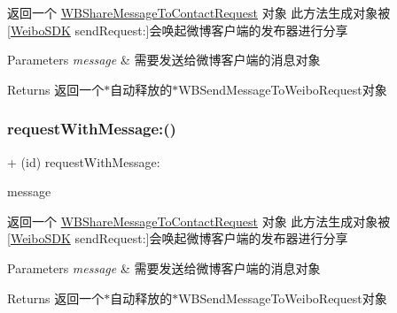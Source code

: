 返回一个 \mbox{\hyperlink{interface_w_b_share_message_to_contact_request}{W\+B\+Share\+Message\+To\+Contact\+Request}} 对象 此方法生成对象被\mbox{[}\mbox{\hyperlink{interface_weibo_s_d_k}{Weibo\+S\+DK}} send\+Request\+:\mbox{]}会唤起微博客户端的发布器进行分享 
\begin{DoxyParams}{Parameters}
{\em message} & 需要发送给微博客户端的消息对象 \\
\hline
\end{DoxyParams}
\begin{DoxyReturn}{Returns}
返回一个$\ast$自动释放的$\ast$\+W\+B\+Send\+Message\+To\+Weibo\+Request对象 
\end{DoxyReturn}
\mbox{\label{interface_w_b_share_message_to_contact_request_a8ee52281e0f9bb9f8b006d298760c001}} 
\subsubsection{\texorpdfstring{request\+With\+Message\+:()}{requestWithMessage:()}\hspace{0.1cm}{\footnotesize\ttfamily [2/3]}}
{\footnotesize\ttfamily + (id) request\+With\+Message\+: \begin{DoxyParamCaption}\item[{(\mbox{\hyperlink{interface_w_b_message_object}{W\+B\+Message\+Object}} $\ast$)}]{message }\end{DoxyParamCaption}}

返回一个 \mbox{\hyperlink{interface_w_b_share_message_to_contact_request}{W\+B\+Share\+Message\+To\+Contact\+Request}} 对象 此方法生成对象被\mbox{[}\mbox{\hyperlink{interface_weibo_s_d_k}{Weibo\+S\+DK}} send\+Request\+:\mbox{]}会唤起微博客户端的发布器进行分享 
\begin{DoxyParams}{Parameters}
{\em message} & 需要发送给微博客户端的消息对象 \\
\hline
\end{DoxyParams}
\begin{DoxyReturn}{Returns}
返回一个$\ast$自动释放的$\ast$\+W\+B\+Send\+Message\+To\+Weibo\+Request对象 
\end{DoxyReturn}
\mbox{\label{interface_w_b_share_message_to_contact_request_a8ee52281e0f9bb9f8b006d298760c001}} 
